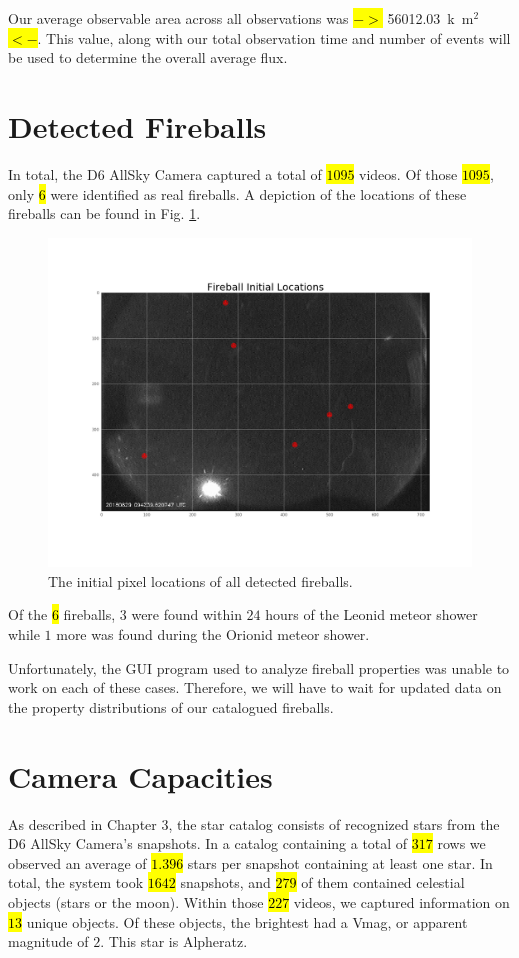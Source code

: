 Our average observable area across all observations was \hl{$->$} \SI{56012.03}{k\meter}$^2$ \hl{$<-$}.
This value, along with our total observation time and number of events will be used to determine the overall average flux.


\section{Detected Fireballs}

In total, the D6 AllSky Camera captured a total of \hl{$1095$} videos.  
Of those \hl{$1095$}, only \hl{$6$} were identified as real fireballs.
A depiction of the locations of these fireballs can be found in Fig. \ref{fireball_locs}.  

\begin{figure}[ht!]
  \centering
  \includegraphics[scale=0.25]{images/fireball_initlocs.png}
  \caption{The initial pixel locations of all detected fireballs.}
  \label{fireball_locs}
\end{figure}

Of the \hl{$6$} fireballs, $3$ were found within $24$ hours of the Leonid meteor shower while $1$ more was found during the Orionid meteor shower.  

Unfortunately, the GUI program used to analyze fireball properties was unable to work on each of these cases.  
Therefore, we will have to wait for updated data on the property distributions of our catalogued fireballs.


\section{Camera Capacities}

As described in Chapter 3, the star catalog consists of recognized stars from the D6 AllSky Camera's snapshots.
In a catalog containing a total of \hl{$317$} rows we observed an average of \hl{$1.396$} stars per snapshot containing at least one star.
In total, the system took \hl{$1642$} snapshots, and \hl{$279$} of them contained celestial objects (stars or the moon).  
Within those \hl{$227$} videos, we captured information on \hl{$13$} unique objects.
Of these objects, the brightest had a Vmag, or apparent magnitude of $2$.  
This star is Alpheratz.  


